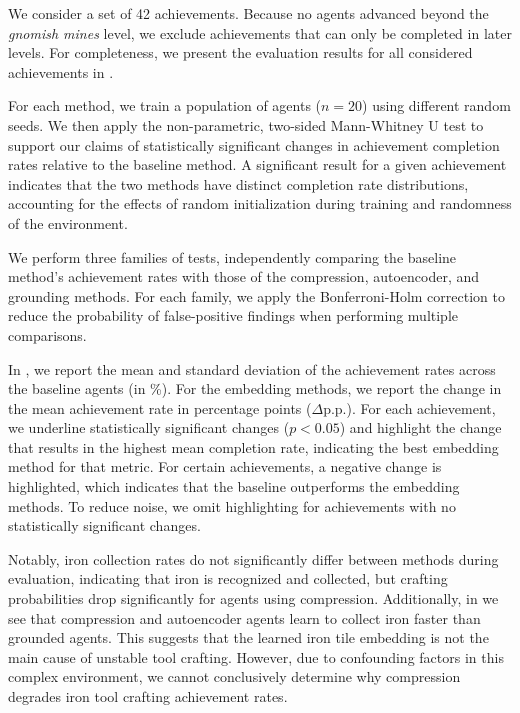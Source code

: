 \documentclass[final]{nesy2026}
\begin{document}
We consider a set of 42 achievements.
Because no agents advanced beyond the \emph{gnomish mines} level, we exclude achievements that can only be completed in later levels.
For completeness, we present the evaluation results for all considered achievements in .

For each method, we train a population of agents ($n = 20$) using different random seeds.
We then apply the non-parametric, two-sided Mann-Whitney U test to support our claims of statistically significant changes in achievement completion rates relative to the baseline method.
A significant result for a given achievement indicates that the two methods have distinct completion rate distributions, accounting for the effects of random initialization during training and randomness of the environment.

We perform three families of tests, independently comparing the baseline method's achievement rates with those of the compression, autoencoder, and grounding methods.
For each family, we apply the Bonferroni-Holm correction to reduce the probability of false-positive findings when performing multiple comparisons.

In , we report the mean and standard deviation of the achievement rates across the baseline agents (in \%).
For the embedding methods, we report the change in the mean achievement rate in percentage points ($\Delta$p.p.).
For each achievement, we underline statistically significant changes ($p < 0.05$) and highlight the change that results in the highest mean completion rate, indicating the best embedding method for that metric.
For certain achievements, a negative change is highlighted, which indicates that the baseline outperforms the embedding methods.
To reduce noise, we omit highlighting for achievements with no statistically significant changes.

Notably, iron collection rates do not significantly differ between methods during evaluation, indicating that iron is recognized and collected, but crafting probabilities drop significantly for agents using compression.
Additionally, in  we see that compression and autoencoder agents learn to collect iron faster than grounded agents.
This suggests that the learned iron tile embedding is not the main cause of unstable tool crafting.
However, due to confounding factors in this complex environment, we cannot conclusively determine why compression degrades iron tool crafting achievement rates.
\end{document}
